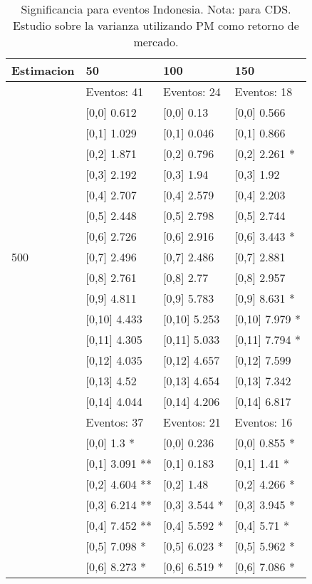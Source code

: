 \begin{table}

\caption{Significancia para eventos Indonesia. Nota: para CDS. Estudio sobre la varianza utilizando PM como retorno de mercado.}
\centering
\begin{tabular}[t]{llll}
\toprule
Estimacion & 50 & 100 & 150\\
\midrule
 & Eventos:  41 & Eventos:  24 & Eventos:  18\\
 & {}[0,0] 0.612 & {}[0,0] 0.13 & {}[0,0] 0.566\\
 & {}[0,1] 1.029 & {}[0,1] 0.046 & {}[0,1] 0.866\\
 & {}[0,2] 1.871 & {}[0,2] 0.796 & {}[0,2] 2.261 *\\
 & {}[0,3] 2.192 & {}[0,3] 1.94 & {}[0,3] 1.92\\
\addlinespace
 & {}[0,4] 2.707 & {}[0,4] 2.579 & {}[0,4] 2.203\\
 & {}[0,5] 2.448 & {}[0,5] 2.798 & {}[0,5] 2.744\\
 & {}[0,6] 2.726 & {}[0,6] 2.916 & {}[0,6] 3.443 *\\
500 & {}[0,7] 2.496 & {}[0,7] 2.486 & {}[0,7] 2.881\\
 & {}[0,8] 2.761 & {}[0,8] 2.77 & {}[0,8] 2.957\\
\addlinespace
 & {}[0,9] 4.811 & {}[0,9] 5.783 & {}[0,9] 8.631 *\\
 & {}[0,10] 4.433 & {}[0,10] 5.253 & {}[0,10] 7.979 *\\
 & {}[0,11] 4.305 & {}[0,11] 5.033 & {}[0,11] 7.794 *\\
 & {}[0,12] 4.035 & {}[0,12] 4.657 & {}[0,12] 7.599\\
 & {}[0,13] 4.52 & {}[0,13] 4.654 & {}[0,13] 7.342\\
\addlinespace
 & {}[0,14] 4.044 & {}[0,14] 4.206 & {}[0,14] 6.817\\
 & Eventos:  37 & Eventos:  21 & Eventos:  16\\
 & {}[0,0] 1.3 * & {}[0,0] 0.236 & {}[0,0] 0.855 *\\
 & {}[0,1] 3.091 ** & {}[0,1] 0.183 & {}[0,1] 1.41 *\\
 & {}[0,2] 4.604 ** & {}[0,2] 1.48 & {}[0,2] 4.266 *\\
\addlinespace
 & {}[0,3] 6.214 ** & {}[0,3] 3.544 * & {}[0,3] 3.945 *\\
 & {}[0,4] 7.452 ** & {}[0,4] 5.592 * & {}[0,4] 5.71 *\\
 & {}[0,5] 7.098 * & {}[0,5] 6.023 * & {}[0,5] 5.962 *\\
 & {}[0,6] 8.273 * & {}[0,6] 6.519 * & {}[0,6] 7.086 *\\

\end{tabular}
\end{table}
